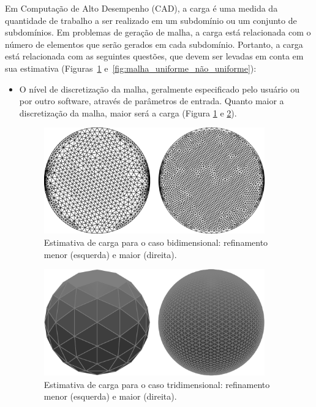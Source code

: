 Em Computação de Alto Desempenho (CAD), a carga é uma medida da quantidade de trabalho a ser realizado em um subdomínio ou um conjunto de subdomínios. Em problemas de geração de malha, a carga está relacionada com o número de elementos que serão gerados em cada subdomínio. Portanto, a carga está relacionada com as seguintes questões, que devem ser levadas em conta em sua estimativa (Figuras~\ref{fig:malha_norma_refinada} e~\ref{fig:malha_uniforme_não_uniforme}):

\begin{itemize}
	\item O nível de discretização da malha, geralmente especificado pelo usuário ou por outro software, através de parâmetros de entrada. Quanto maior a discretização da malha, maior será a carga (Figura \ref{fig:malha_norma_refinada} e \ref{fig:malha_norma_refinada_trid}).

\begin{figure}[!ht]
	\centering
	\includegraphics[width=0.9\textwidth]{fig/meshes_normal_and_refined.png}
	\caption{Estimativa de carga para o caso bidimensional: refinamento menor (esquerda) e maior (direita).}
	\label{fig:malha_norma_refinada}
\end{figure}

\begin{figure}[!ht]
	\centering
	\includegraphics[width=0.9\textwidth]{fig/esferas_comp_ref.png}
	\caption{Estimativa de carga para o caso tridimensional: refinamento menor (esquerda) e maior (direita).}
	\label{fig:malha_norma_refinada_trid}
\end{figure}


\end{itemize}
